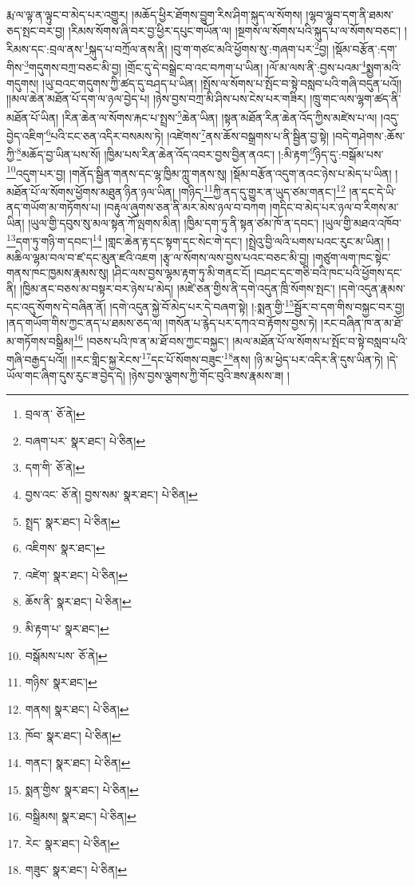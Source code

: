 རྨ་ལ་ལྟ་ན་ལྟུང་བ་མེད་པར་འགྱུར། །མཆོད་ཕྱིར་ཐོགས་བྱུག་རིས་ཤིག་སྐུད་ལ་སོགས། །ལྷབ་ལྷུབ་དག་ནི་ཐམས་ཅད་སྤང་བར་བྱ། །རིམས་སོགས་ཞི་བར་བྱ་ཕྱིར་དཔུང་གཡོན་ལ། །སྔགས་ལ་སོགས་པའི་སྐུད་པ་ལ་སོགས་བཅང་། །རིམས་དང་:བྲལ་ནས་\footnote{བྲལ་ན་  ཅོ་ནེ། }སྐུད་པ་བཀྲོལ་ནས་ནི། །བུ་ག་གཙང་མའི་ཕྱོགས་སུ་:གཞག་པར་\footnote{བཞག་པར་  སྣར་ཐང་།  པེ་ཅིན། }བྱ། །སྡོམ་བརྩོན་:དག་གིས་\footnote{དག་གི་  ཅོ་ནེ། }གདུགས་བཀྲ་བཅང་མི་བྱ། །གྲོང་དུ་དེ་བསྒྲེང་བ་འང་བཀག་པ་ཡིན། །ལོ་མ་ལས་ནི་:བྱས་པའམ་\footnote{བྱས་འང་  ཅོ་ནེ། བྱས་སམ་  སྣར་ཐང་།  པེ་ཅིན། }སྨྱག་མའི་གདུགས། །ཡུ་བའང་གདུགས་ཀྱི་ཚད་དུ་བཤད་པ་ཡིན། །སྤོས་ལ་སོགས་པ་སྤོང་བ་སྟེ་བསླབ་པའི་གཞི་བདུན་པའོ།། །།མལ་ཆེན་མཐོན་པོ་དག་ལ་ཉལ་བྱེད་པ། །ཉེས་བྱས་བཀྲ་མི་ཤིས་པས་ངེས་པར་གཟིར། །ཁྲུ་གང་ལས་ལྷག་ཚད་ནི་མཐོན་པོ་ཡིན། །རིན་ཆེན་ལ་སོགས་རྐང་པ་སྤྲས་\footnote{སྤྲད་  སྣར་ཐང་།  པེ་ཅིན། }ཆེན་ཡིན། །སྟན་མཐོན་རིན་ཆེན་འོད་ཀྱིས་མཛེས་པ་ལ། །འདུ་བྱེད་འཇིག་\footnote{འཇིགས་  སྣར་ཐང་། }པའི་ངང་ཅན་འདིར་བསམས་ཏེ། །འཛེགས་\footnote{འཛེག་  སྣར་ཐང་།  པེ་ཅིན། }ནས་ཆོས་བསྒྲགས་པ་ནི་སྦྱིན་བྱ་སྟེ། །བདེ་གཤེགས་:ཆོས་ཀྱི་\footnote{ཆོས་ནི་  སྣར་ཐང་།  པེ་ཅིན། }མཆོད་བྱ་ཡིན་པས་སོ། །ཁྱིམ་པས་རིན་ཆེན་འོད་འབར་བྱས་བྱིན་ནའང་། །:མི་རྟག་\footnote{མི་རྟག་པ་  སྣར་ཐང་། }ཉིད་དུ་:བསྒོམ་པས་\footnote{བསྒོམས་པས་  ཅོ་ནེ། }འདུག་པར་བྱ། །གནོད་སྦྱིན་གནས་དང་ལྷ་ཁྱིམ་ཀླུ་གནས་སུ། །སྡོམ་བརྩོན་འདུག་ནའང་ཉེས་པ་མེད་པ་ཡིན། །མཐོན་པོ་ལ་སོགས་ཕྱོགས་མཐུན་ཉིན་ཉལ་ཡིན། །གཉིད་\footnote{གཉིས་  སྣར་ཐང་། }ཀྱི་ནད་དུ་གྱུར་ན་ཡུད་ཙམ་གནང་།\footnote{གནས།  སྣར་ཐང་།  པེ་ཅིན། } །ན་དང་དེ་ཡི་ནད་གཡོག་མ་གཏོགས་པ། །བརྟུལ་ཞུགས་ཅན་ནི་མར་མེས་ཉལ་བ་བཀག །གདིང་བ་མེད་པར་ཉལ་བ་རིགས་མ་ཡིན། །ཡུལ་གྱི་དབུས་སུ་མལ་སྟན་ཀོ་ལྤགས་མིན། །ཁྱིམ་དག་ཏུ་ནི་སྟན་ཙམ་ཁོ་ན་དབང་། །ཡུལ་གྱི་མཐའ་འཁོབ་\footnote{ཁོབ་  སྣར་ཐང་།  པེ་ཅིན། }དག་ཏུ་གཉི་ག་དབང་།\footnote{གནང་།  སྣར་ཐང་།  པེ་ཅིན། } །གླང་ཆེན་རྟ་དང་སྟག་དང་སེང་གེ་དང་། །སྤྲེའུ་བྱི་ལའི་པགས་པའང་རུང་མ་ཡིན། །མཆིལ་ལྷམ་བལ་བ་ཛ་དང་མུན་ཛའི་འཇག །རྩྭ་ལ་སོགས་ལས་བྱས་པའང་བཅང་མི་བྱ། །གཙུག་ལག་ཁང་སྟེང་གནས་ཁང་ཁྱམས་རྣམས་སུ། །ཤིང་ལས་བྱས་ལྷམ་རྟག་ཏུ་མི་གནང་ངོ། །བཤང་དང་གཅི་བའི་ཁང་པའི་ཕྱོགས་དང་ནི། །ཁྱིམ་ནང་བཅས་མ་བསྟར་བར་ཉེས་པ་མེད། །མཛེ་ཅན་གྱིས་ནི་དགེ་འདུན་ཁྲི་སོགས་སྤང་། །དགེ་འདུན་རྣམས་དང་འདུ་སོགས་དེ་བཞིན་ནོ། །དགེ་འདུན་སྐྱེ་བོ་མེད་པར་དེ་བཞག་སྟེ། །:སྨན་གྱི་\footnote{སྨན་གྱིས་  སྣར་ཐང་།  པེ་ཅིན། }སྦྱོར་བ་དག་གིས་བསྐྱང་བར་བྱ། །ནད་གཡོག་གིས་ཀྱང་ནད་པ་ཐམས་ཅད་ལ། །གསོན་པ་རྙེད་པར་དཀའ་བ་རྟོགས་བྱས་ཏེ། །རང་བཞིན་ཁ་ན་མ་ཐོ་མ་གཏོགས་བསྒྲིམ།\footnote{བསྒྲིམས།  སྣར་ཐང་།  པེ་ཅིན། } །བཅས་པའི་ཁ་ན་མ་ཐོ་བས་ཀྱང་བསྐྱང་། །མལ་མཐོན་པོ་ལ་སོགས་པ་སྤོང་བ་སྟེ་བསླབ་པའི་གཞི་བརྒྱད་པའོ།། །།རང་གླིང་སྐྱ་རེངས་\footnote{རེང་  སྣར་ཐང་།  པེ་ཅིན། }དང་པོ་སོགས་བཟུང་\footnote{གཟུང་  སྣར་ཐང་།  པེ་ཅིན། }ནས། །ཉི་མ་ཕྱེད་པར་འདིར་ནི་དུས་ཡིན་ཏེ། །དེ་ཡོལ་གང་ཞིག་དུས་རུང་ཟ་བྱེད་དེ། །ཉེས་བྱས་ལྕགས་ཀྱི་གོང་བུའི་ཟས་རྣམས་ཟ། །
